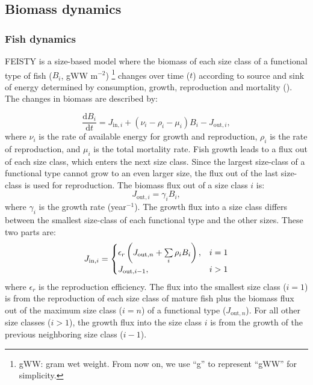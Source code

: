\documentclass[
]{article}
\begin{document}
\subsection{Biomass dynamics}\label{biomass-dynamics}

\subsubsection{Fish dynamics}\label{fish-dynamics}

FEISTY is a size-based model where the biomass of each size class of a
functional type of fish (\(B_i\), gWW m\(^{-2}\)) \footnote{gWW: gram
  wet weight. From now on, we use ``g'' to represent ``gWW'' for
  simplicity.} changes over time (\(t\)) according to source and sink of
energy determined by consumption, growth, reproduction and mortality
(). The changes in biomass
are described by:

\begin{equation}
\dfrac{\mathrm{d}B_{i}}{\mathrm{d}t} =  J_{\mathrm{in},i}  + (\nu_{i} - \rho_i -\mu_i)B_i - J_{\mathrm{out},i},
\end{equation} where \(\nu_{i}\) is the rate of available energy for
growth and reproduction, \(\rho_i\) is the rate of reproduction, and
\(\mu_i\) is the total mortality rate. Fish growth leads to a flux out
of each size class, which enters the next size class. Since the largest
size-class of a functional type cannot grow to an even larger size, the
flux out of the last size-class is used for reproduction. The biomass
flux out of a size class \(i\) is: \begin{equation}
J_{\mathrm{out},i} = \gamma_i B_i,
\end{equation} where \(\gamma_i\) is the growth rate (year\(^{-1}\)).
The growth flux into a size class differs between the smallest
size-class of each functional type and the other sizes. These two parts
are: \begin{equation}
    J_{\mathrm{in},i} =
  \begin{cases}
\epsilon_r \left(  J_{\mathrm{out},n} + \sum\limits_i \rho_i B_i \right),      & \text{$ i=1 $} \\
     J_{\mathrm{out},i-1}, & \text{$ i > 1$} 
  \end{cases}
\end{equation} where \(\epsilon_r\) is the reproduction efficiency. The
flux into the smallest size class (\(i=1\)) is from the reproduction of
each size class of mature fish plus the biomass flux out of the maximum
size class (\(i=n\)) of a functional type (\(J_{\mathrm{out},n}\)). For
all other size classes (\(i > 1\)), the growth flux into the size class
\(i\) is from the growth of the previous neighboring size class
(\(i-1\)).
\end{document}

